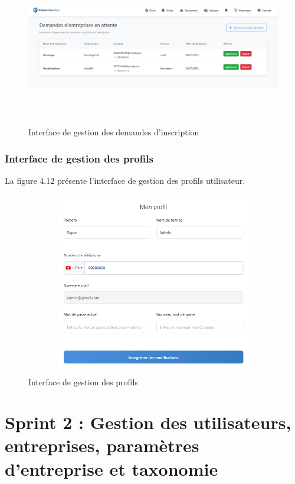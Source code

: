 \begin{figure}[H]
    \centering
    \includegraphics[width=15cm,height=7cm]{images/approvepic.PNG}
    \caption{Interface de gestion des demandes d'inscription}
\end{figure}

\subsubsection{Interface de gestion des profils}
\noindent La figure 4.12 présente l'interface de gestion des profils utilisateur.

\begin{figure}[H]
    \centering
    \includegraphics[width=13cm,height=8cm]{images/profilepic.PNG}
    \caption{Interface de gestion des profils}
\end{figure}

\section{Sprint 2 : Gestion des utilisateurs, entreprises, paramètres d'entreprise et taxonomie}

